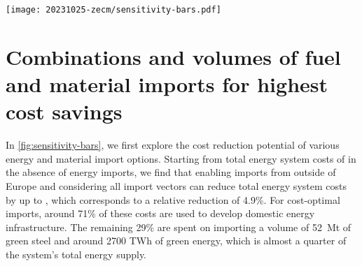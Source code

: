 




\begin{figure*}
    \texttt{[image: 20231025-zecm/sensitivity-bars.pdf]}
    \caption{\textbf{Potential for cost reductions with reduced sets of import options.}
        Subsets of available import options are sorted by ascending cost reduction potential. 
        Top panel shows profile of total cost savings.
        Bottom panel shows composition and extent of imports in relation to total energy system costs.
        Percentage numbers in bar plot indicate the share of total system costs spent on domestic energy infrastructure.
        Alternative versions of this figure with higher and lower import cost assumptions are included in the supplementary material.
    }
    \label{fig:sensitivity-bars}
\end{figure*}



\section*{Combinations and volumes of fuel and material imports for highest cost savings}

In \cref{fig:sensitivity-bars}, we first explore the cost reduction potential of
various energy and material import options. Starting from total energy system
costs of  in the absence of energy imports, we find that enabling
imports from outside of Europe and considering all import vectors can reduce
total energy system costs by up to , which corresponds to a relative reduction
of 4.9\%.
For cost-optimal imports, around 71\% of these costs are used to develop domestic
energy infrastructure. The remaining 29\% are spent on importing a volume of
52~Mt of green steel and around 2700 TWh of green energy, which is almost a
quarter of the system's total energy supply.

